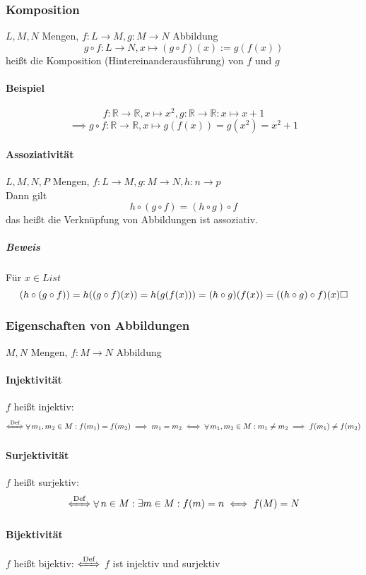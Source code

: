 \documentclass[a4paper]{scrartcl}
\DeclareMathOperator{\Forall}{\forall}
\theoremstyle{definition}
\theoremstyle{plain}
\theoremstyle{plain}
\theoremstyle{remark}
\theoremstyle{remark}
\theoremstyle{remark}
\theoremstyle{remark}
\theoremstyle{remark}
\begin{document}
\subsubsection{Komposition}
\label{sec-2-6-6}
$L,M,N$ Mengen, $f:L\to M,g:M\to N$ Abbildung \\
    \[g\circ f: L\to N, x\mapsto(g\circ f)(x):=g(f(x))\]
heißt die Komposition (Hintereinanderausführung) von $f$ und $g$
\paragraph{Beispiel}
\label{sec-2-6-6-1}
\[f:\mathbb{R}\to\mathbb{R},x\mapsto x^2, g:\mathbb{R}\to\mathbb{R}:x\mapsto x + 1\]
\[\implies g\circ f:\mathbb{R}\to\mathbb{R},x\mapsto g(f(x)) = g(x^2) = x^2 + 1\]
\paragraph{Assoziativität}
\label{sec-2-6-6-2}
$L,M,N,P$ Mengen, $f:L\to M, g:M\to N,h:n\to p$ \\
     Dann gilt
\[h\circ (g\circ f) = (h\circ g)\circ f\]
das heißt die Verknüpfung von Abbildungen ist assoziativ.
\subparagraph{Beweis}
\label{sec-2-6-6-2-1}
Für $x\in L ist$ \\
      \[(h\circ (g\circ f)) = h((g\circ f)(x)) = h(g(f(x))) = (h\circ g)(f(x)) = ((h\circ g)\circ f)(x)\hfill\square\]
\subsubsection{Eigenschaften von Abbildungen}
\label{sec-2-6-7}
$M,N$ Mengen, $f:M\to N$ Abbildung
\paragraph{Injektivität}
\label{sec-2-6-7-1}
$f$ heißt injektiv: \[\xLeftrightarrow{\text{Def}} \Forall m_1,m_2\in M: f(m_1) = f(m_2) \implies m_1 = m_2 \iff \Forall m_1,m_2\in M: m_1\neq m_2 \implies f(m_1)\neq f(m_2)\]
\paragraph{Surjektivität}
\label{sec-2-6-7-2}
$f$ heißt surjektiv:
\[\xLeftrightarrow{\text{Def}} \Forall n\in M :\exists m\in M: f(m) = n \iff f(M) = N\]
\paragraph{Bijektivität}
\label{sec-2-6-7-3}
$f$ heißt bijektiv: $\xLeftrightarrow{\text{Def}}$ $f$ ist injektiv und surjektiv
\end{document}
